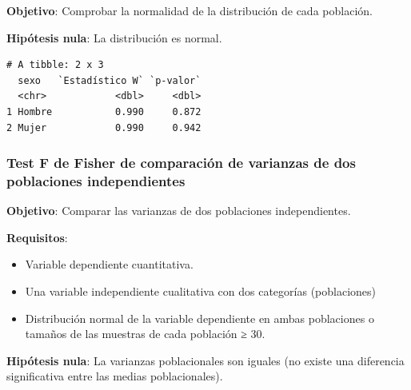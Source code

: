 \documentclass[
  spanish,
  a4paper,
]{scrreport}
\newenvironment{Shaded}{\begin{snugshade}}{\end{snugshade}}
\newcommand{\AttributeTok}[1]{\textcolor[rgb]{0.40,0.45,0.13}{#1}}
\newcommand{\FunctionTok}[1]{\textcolor[rgb]{0.28,0.35,0.67}{#1}}
\newcommand{\NormalTok}[1]{\textcolor[rgb]{0.00,0.23,0.31}{#1}}
\newcommand{\OtherTok}[1]{\textcolor[rgb]{0.00,0.23,0.31}{#1}}
\newcommand{\SpecialCharTok}[1]{\textcolor[rgb]{0.37,0.37,0.37}{#1}}
\newcommand{\StringTok}[1]{\textcolor[rgb]{0.13,0.47,0.30}{#1}}
\providecommand{\tightlist}{%
  \setlength{\itemsep}{0pt}\setlength{\parskip}{0pt}}
\theoremstyle{definition}
\theoremstyle{definition}
\theoremstyle{remark}
\begin{document}
\textbf{Objetivo}: Comprobar la normalidad de la distribución de cada
población.

\textbf{Hipótesis nula}: La distribución es normal.

\begin{Shaded}
\end{Shaded}

\begin{verbatim}
# A tibble: 2 x 3
  sexo   `Estadístico W` `p-valor`
  <chr>            <dbl>     <dbl>
1 Hombre           0.990     0.872
2 Mujer            0.990     0.942
\end{verbatim}

\subsubsection{Test F de Fisher de comparación de varianzas de dos
poblaciones
independientes}\label{test-f-de-fisher-de-comparaciuxf3n-de-varianzas-de-dos-poblaciones-independientes}

\textbf{Objetivo}: Comparar las varianzas de dos poblaciones
independientes.

\textbf{Requisitos}:

\begin{itemize}
\tightlist
\item
  Variable dependiente cuantitativa.
\item
  Una variable independiente cualitativa con dos categorías
  (poblaciones)
\item
  Distribución normal de la variable dependiente en ambas poblaciones o
  tamaños de las muestras de cada población ≥ 30.
\end{itemize}

\textbf{Hipótesis nula}: La varianzas poblacionales son iguales (no
existe una diferencia significativa entre las medias poblacionales).
\end{document}
